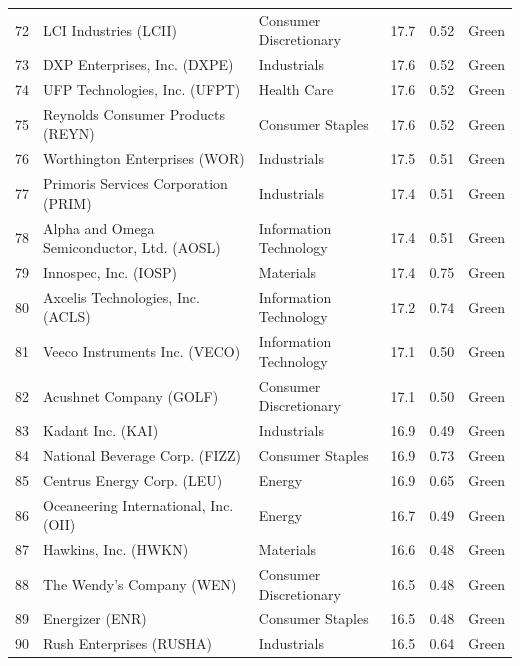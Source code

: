 \documentclass[11pt,a4paper]{article}
\begin{document}
{\begin{longtable}{r p{4.6cm} p{3cm} r r l}
72 & LCI Industries (LCII) & Consumer Discretionary & 17.7 & 0.52 & \cellcolor[HTML]{C6EFCE}Green \\
73 & DXP Enterprises, Inc. (DXPE) & Industrials & 17.6 & 0.52 & \cellcolor[HTML]{C6EFCE}Green \\
74 & UFP Technologies, Inc. (UFPT) & Health Care & 17.6 & 0.52 & \cellcolor[HTML]{C6EFCE}Green \\
75 & Reynolds Consumer Products (REYN) & Consumer Staples & 17.6 & 0.52 & \cellcolor[HTML]{C6EFCE}Green \\
76 & Worthington Enterprises (WOR) & Industrials & 17.5 & 0.51 & \cellcolor[HTML]{C6EFCE}Green \\
77 & Primoris Services Corporation (PRIM) & Industrials & 17.4 & 0.51 & \cellcolor[HTML]{C6EFCE}Green \\
78 & Alpha and Omega Semiconductor, Ltd. (AOSL) & Information Technology & 17.4 & 0.51 & \cellcolor[HTML]{C6EFCE}Green \\
79 & Innospec, Inc. (IOSP) & Materials & 17.4 & 0.75 & \cellcolor[HTML]{C6EFCE}Green \\
80 & Axcelis Technologies, Inc. (ACLS) & Information Technology & 17.2 & 0.74 & \cellcolor[HTML]{C6EFCE}Green \\
81 & Veeco Instruments Inc. (VECO) & Information Technology & 17.1 & 0.50 & \cellcolor[HTML]{C6EFCE}Green \\
82 & Acushnet Company (GOLF) & Consumer Discretionary & 17.1 & 0.50 & \cellcolor[HTML]{C6EFCE}Green \\
83 & Kadant Inc. (KAI) & Industrials & 16.9 & 0.49 & \cellcolor[HTML]{C6EFCE}Green \\
84 & National Beverage Corp. (FIZZ) & Consumer Staples & 16.9 & 0.73 & \cellcolor[HTML]{C6EFCE}Green \\
85 & Centrus Energy Corp. (LEU) & Energy & 16.9 & 0.65 & \cellcolor[HTML]{C6EFCE}Green \\
86 & Oceaneering International, Inc. (OII) & Energy & 16.7 & 0.49 & \cellcolor[HTML]{C6EFCE}Green \\
87 & Hawkins, Inc. (HWKN) & Materials & 16.6 & 0.48 & \cellcolor[HTML]{C6EFCE}Green \\
88 & The Wendy's Company (WEN) & Consumer Discretionary & 16.5 & 0.48 & \cellcolor[HTML]{C6EFCE}Green \\
89 & Energizer (ENR) & Consumer Staples & 16.5 & 0.48 & \cellcolor[HTML]{C6EFCE}Green \\
90 & Rush Enterprises (RUSHA) & Industrials & 16.5 & 0.64 & \cellcolor[HTML]{C6EFCE}Green \\

\end{longtable}}
\end{document}
